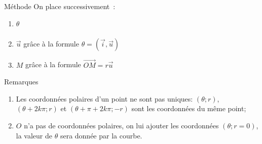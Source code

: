 \documentclass[14pt]{beamer}
\begin{document}
\begin{frame}
        \begin{block}{Méthode}
                On place successivement~:
                \begin{enumerate}
                                \item<1-> $\theta$
                                \item<2-> $\vec{u}$ grâce à la formule $\theta = \widehat{(\vec{i}, \vec{u})}$
                                \item<3-> $M$ grâce à la formule $\vec{OM} = r\vec{u}$
                \end{enumerate}
                \begin{center}
                \end{center}
        \end{block}
\end{frame}
\begin{frame}
        \begin{block}{Remarques}
                \begin{enumerate}
                                \item Les coordonnées polaires d'un point ne sont pas uniques:
                                        $(\theta;r)$, $(\theta+2k\pi;r)$ et $(\theta+\pi+2k\pi;-r)$
                                        sont les coordonnées du même point;
                                \item $O$ n'a pas de coordonnées polaires, on lui ajouter les coordonnées
                                        $(\theta; r=0)$, la valeur de $\theta$ sera donnée par
                                        la courbe.
                \end{enumerate}
        \end{block}
\end{frame}
\end{document}
